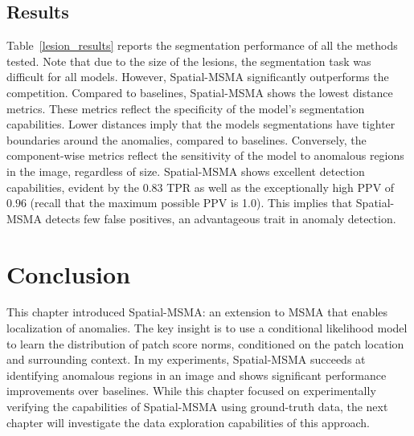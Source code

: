 \subsection*{Results}

Table~\ref{lesion_results} reports the segmentation performance of all the methods tested. Note that due to the size of the lesions, the segmentation task was difficult for all models. However, Spatial-MSMA significantly outperforms the competition. Compared to baselines, Spatial-MSMA shows the lowest distance metrics. These metrics reflect the specificity of the model's segmentation capabilities. Lower distances imply that the models segmentations have tighter boundaries around the anomalies, compared to baselines. Conversely, the component-wise metrics reflect the sensitivity of the model to anomalous regions in the image, regardless of size. Spatial-MSMA shows excellent detection capabilities, evident by the $0.83$ TPR as well as the exceptionally high PPV of $0.96$ (recall that the maximum possible PPV is 1.0). This implies that Spatial-MSMA detects few false positives, an advantageous trait in anomaly detection.

\section{Conclusion}
This chapter introduced Spatial-MSMA: an extension to MSMA that enables localization of anomalies. The key insight is to use a conditional likelihood model to learn the distribution of patch score norms, conditioned on the patch location and surrounding context. In my experiments, Spatial-MSMA succeeds at identifying anomalous regions in an image and shows significant performance improvements over baselines. While this chapter focused on experimentally verifying the capabilities of Spatial-MSMA using ground-truth data, the next chapter will investigate the data exploration capabilities of this approach.